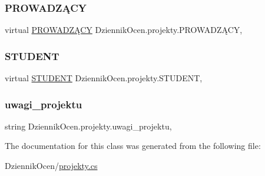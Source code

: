 \subsubsection{\texorpdfstring{P\+R\+O\+W\+A\+D\+ZĄ\+CY}{PROWADZĄCY}}
{\footnotesize\ttfamily virtual \hyperlink{class_dziennik_ocen_1_1_p_r_o_w_a_d_z_xC4_x84_c_y}{P\+R\+O\+W\+A\+D\+ZĄ\+CY} Dziennik\+Ocen.\+projekty.\+P\+R\+O\+W\+A\+D\+ZĄ\+CY\hspace{0.3cm}{\ttfamily [get]}, {\ttfamily [set]}}

\mbox{\label{class_dziennik_ocen_1_1projekty_a7a8766d51790e50fa5761926969acb47}} 
\subsubsection{\texorpdfstring{S\+T\+U\+D\+E\+NT}{STUDENT}}
{\footnotesize\ttfamily virtual \hyperlink{class_dziennik_ocen_1_1_s_t_u_d_e_n_t}{S\+T\+U\+D\+E\+NT} Dziennik\+Ocen.\+projekty.\+S\+T\+U\+D\+E\+NT\hspace{0.3cm}{\ttfamily [get]}, {\ttfamily [set]}}

\mbox{\label{class_dziennik_ocen_1_1projekty_a45c374959bb146a38aac3d9216003b05}} 
\subsubsection{\texorpdfstring{uwagi\+\_\+projektu}{uwagi\_projektu}}
{\footnotesize\ttfamily string Dziennik\+Ocen.\+projekty.\+uwagi\+\_\+projektu\hspace{0.3cm}{\ttfamily [get]}, {\ttfamily [set]}}



The documentation for this class was generated from the following file\+:\begin{DoxyCompactItemize}
\item 
Dziennik\+Ocen/\hyperlink{projekty_8cs}{projekty.\+cs}\end{DoxyCompactItemize}
